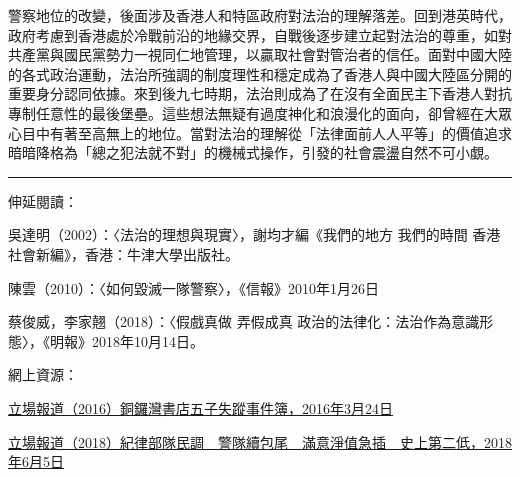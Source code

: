 警察地位的改變，後面涉及香港人和特區政府對法治的理解落差。回到港英時代，政府考慮到香港處於冷戰前沿的地緣交界，自戰後逐步建立起對法治的尊重，如對共產黨與國民黨勢力一視同仁地管理，以贏取社會對管治者的信任。面對中國大陸的各式政治運動，法治所強調的制度理性和穩定成為了香港人與中國大陸區分開的重要身分認同依據。來到後九七時期，法治則成為了在沒有全面民主下香港人對抗專制任意性的最後堡壘。這些想法無疑有過度神化和浪漫化的面向，卻曾經在大眾心目中有著至高無上的地位。當對法治的理解從「法律面前人人平等」的價值追求暗暗降格為「總之犯法就不對」的機械式操作，引發的社會震盪自然不可小覷。

\rule[-10pt]{15cm}{0.05em}

伸延閱讀：

吳達明（2002）：〈法治的理想與現實〉，謝均才編《我們的地方 我們的時間 香港社會新編》，香港：牛津大學出版社。

陳雲（2010）：〈如何毀滅一隊警察〉，《信報》2010年1月26日

蔡俊威，李家翹（2018）：〈假戲真做 弄假成真 政治的法律化：法治作為意識形態〉，《明報》2018年10月14日。

網上資源：

\href{http://www.thestand.news/politics/銅鑼灣書店五子失蹤事件簿/}{立場報道（2016）銅鑼灣書店五子失蹤事件簿，2016年3月24日}

\href{https://thestandnews.com/society/紀律部隊民調續包尾-警隊滿意淨值急插-史上第二低/}{立場報道（2018）紀律部隊民調　警隊續包尾　滿意淨值急插　史上第二低，2018年6月5日}